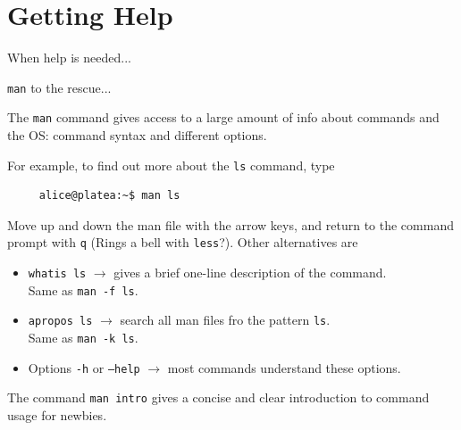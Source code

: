 \section{Getting Help}
\begin{frame}[fragile]{When help is needed...}
  
  \begin{block}{\alert{\texttt{man}} to the rescue...}
    
    {\small
      The \alert{\texttt{man}} command gives access to a large amount of info about commands and the OS: command syntax and different options.}

    {\footnotesize
    For example, to find out more about the \texttt{ls} command, type
      \begin{lstlisting}
     alice@platea:~$ man ls
   \end{lstlisting}
}

    {\footnotesize
Move up and down the man file with the arrow keys, and return to
the command prompt with \alert{\texttt{q}} (Rings a bell with \texttt{less}?). Other alternatives are 
}

{\footnotesize
\vspace{0.15cm}
{\footnotesize
\begin{itemize}
\item \texttt{whatis ls} $\rightarrow$ gives a brief one-line description of the command. \\Same as \texttt{man -f ls}.
\item \texttt{apropos ls} $\rightarrow$ search all man files fro the pattern \texttt{ls}. \\Same as \texttt{man -k ls}.
\item Options \texttt{-h} or \texttt{--help} $\rightarrow$ most commands understand these options.
\end{itemize}
}

The command \alert{\texttt{man intro}} gives a concise and clear introduction to command usage for newbies.}

\end{block}


\end{frame}
